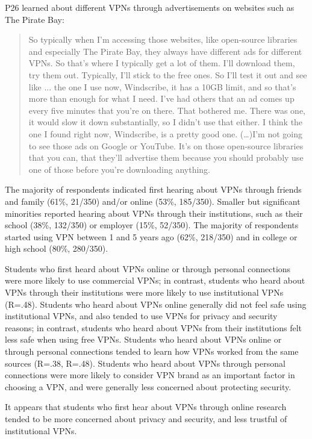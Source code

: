 P26 learned about different VPNs through advertisements on websites such as
The Pirate Bay: \begin{quote}So typically when I'm accessing those websites,
    like open-source libraries and especially The Pirate Bay, they always have
    different ads for different VPNs. So that's where I typically get a lot of
    them. I'll download them, try them out. Typically, I'll stick to the free
    ones. So I'll test it out and see like ... the one I use now, Windscribe,
    it has a 10GB limit, and so that's more than enough for what I need. I've
    had others that an ad comes up every five minutes that you're on there.
    That bothered me. There was one, it would slow it down substantially, so I
    didn't use that either. I think the one I found right now, Windscribe, is
    a pretty good one.  (\dots)I'm not going to see those ads on Google or
YouTube. It's on those open-source libraries that you can, that they'll
advertise them because you should probably use one of those before you're
downloading anything.\end{quote}

The majority of respondents indicated first hearing about VPNs through friends
and family (61\%, 21/350) and/or online (53\%, 185/350). Smaller but
significant minorities reported hearing about VPNs through their institutions,
such as their school (38\%, 132/350) or employer (15\%, 52/350). The majority
of respondents started using VPN between 1 and 5 years ago (62\%, 218/350) and
in college or high school (80\%, 280/350).

Students who first heard about VPNs online or through personal connections
were more likely to use commercial VPNs; in contrast, students who heard about
VPNs through their institutions were more likely to use institutional VPNs
(R=.48). Students who heard about VPNs online generally did not feel safe
using institutional VPNs, and also tended to use VPNs for privacy and security
reasons; in contrast, students who heard about VPNs from their institutions
felt less safe when using free VPNs. Students who heard about VPNs online or
through personal connections tended to learn how VPNs worked from the same
sources (R=.38, R=.48). Students who heard about VPNs through personal
connections were more likely to consider VPN brand as an important factor in
choosing a VPN, and were generally less concerned about protecting security.

It appears that students who first hear about VPNs through online research
tended to be more concerned about privacy and security, and less trustful of
institutional VPNs. 

